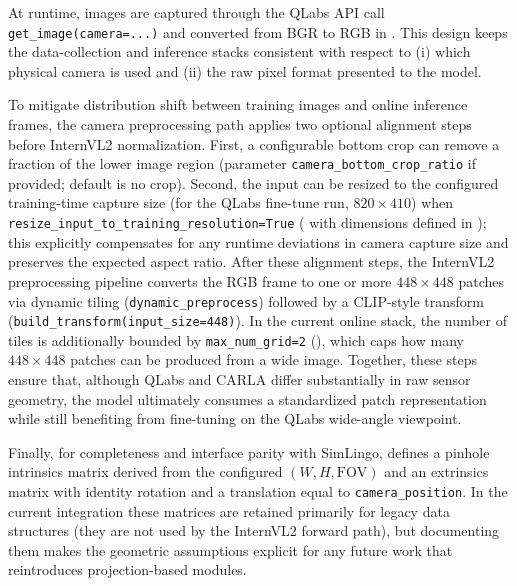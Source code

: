 At runtime, images are captured through the QLabs API call \texttt{get\_image(camera=...)} and converted from BGR to RGB in . This design keeps the data-collection and inference stacks consistent with respect to (i) which physical camera is used and (ii) the raw pixel format presented to the model.

To mitigate distribution shift between training images and online inference frames, the camera preprocessing path applies two optional alignment steps before InternVL2 normalization. First, a configurable bottom crop can remove a fraction of the lower image region (parameter \texttt{camera\_bottom\_crop\_ratio} if provided; default is no crop). Second, the input can be resized to the configured training-time capture size (for the QLabs fine-tune run, $820\times410$) when \texttt{resize\_input\_to\_training\_resolution=True} ( with dimensions defined in ); this explicitly compensates for any runtime deviations in camera capture size and preserves the expected aspect ratio. After these alignment steps, the InternVL2 preprocessing pipeline converts the RGB frame to one or more $448\times448$ patches via dynamic tiling (\texttt{dynamic\_preprocess}) followed by a CLIP-style transform (\texttt{build\_transform(input\_size=448)}). In the current online stack, the number of tiles is additionally bounded by \texttt{max\_num\_grid=2} (), which caps how many $448\times448$ patches can be produced from a wide image. Together, these steps ensure that, although QLabs and CARLA differ substantially in raw sensor geometry, the model ultimately consumes a standardized patch representation while still benefiting from fine-tuning on the QLabs wide-angle viewpoint.

Finally, for completeness and interface parity with SimLingo,  defines a pinhole intrinsics matrix derived from the configured $(W,H,\mathrm{FOV})$ and an extrinsics matrix with identity rotation and a translation equal to \texttt{camera\_position}. In the current integration these matrices are retained primarily for legacy data structures (they are not used by the InternVL2 forward path), but documenting them makes the geometric assumptions explicit for any future work that reintroduces projection-based modules.

